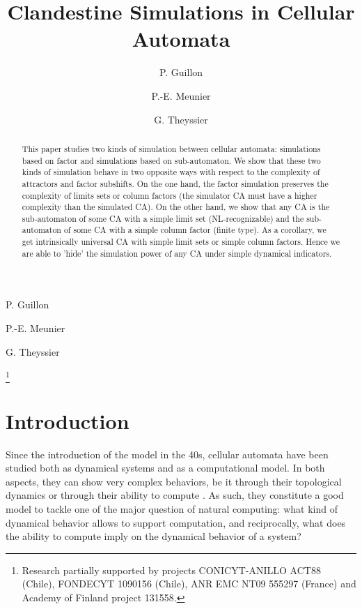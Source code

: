 \documentclass{jac}
\theoremstyle{definition}
\begin{document}
\title{Clandestine Simulations in Cellular Automata}

\author[lab1]{P. Guillon}{P. Guillon}
\address[lab1]{Department of Mathematics, University of Turku, Turku, Finland}

\author[lab2]{P.-E. Meunier}{P.-E. Meunier}
\address[lab2]{LAMA (CNRS, Universit\'e de Savoie),\newline Campus Scientifique 73376 Le Bourget-du-Lac Cedex, France}

\author[lab2]{G. Theyssier}{G. Theyssier}

\thanks{Research partially supported by projects CONICYT-ANILLO ACT88 (Chile), FONDECYT 1090156 (Chile), ANR EMC NT09 555297 (France) and Academy of Finland project 131558.}


\begin{abstract}
  \noindent This paper studies two kinds of simulation between cellular
  automata: simulations based on factor and simulations based on
  sub-automaton. We show that these two kinds of simulation behave in
  two opposite ways with respect to the complexity of attractors and
  factor subshifts. On the one hand, the factor simulation preserves the
  complexity of limits sets or column factors (the simulator CA must
  have a higher complexity than the simulated CA). On the other hand,
  we show that any CA is the sub-automaton of some CA with a simple
  limit set (NL-recognizable) and the sub-automaton of some CA with
  a simple column factor (finite type). As a corollary, we get
  intrinsically universal CA with simple limit sets or simple column
  factors. Hence we are able to 'hide' the simulation power of any CA
  under simple dynamical indicators.
\end{abstract}

\maketitle

\section*{Introduction}

Since the introduction of the model in the 40s, cellular automata have
been studied both as dynamical systems and as a computational model. In both aspects, they can show very complex behaviors, be it through their topological dynamics \cite{kurka} or through their ability to compute \cite{vneumann2,univind}. As such, they constitute a good model to tackle one of the major question of natural computing: what kind of dynamical behavior allows to support computation, and reciprocally, what does the ability to compute imply on the dynamical behavior of a system?
\end{document}
